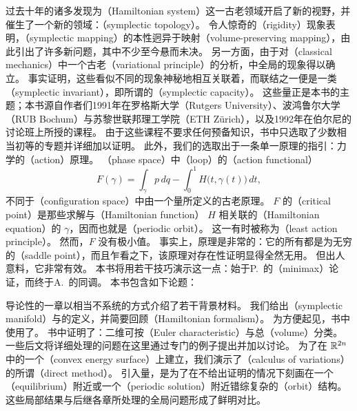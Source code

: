 
过去十年的诸多发现为\textbf{\trHamiltonianSystem}（Hamiltonian system）这一古老领域开启了新的视野，并催生了一个新的领域：\textbf{\trSymplecticTopology}（symplectic topology）。
令人惊奇的\textbf{\trRigidity}（rigidity）现象表明，\textbf{\trSymplectic\trMapping}（symplectic mapping）的本性迥异于\trVolumePreserving{}映射（volume-preserving mapping），由此引出了许多新问题，其中不少至今悬而未决。
另一方面，由于对\textbf{\trClassicalMechanics}（classical mechanics）中一个古老\textbf{\trVariationalPrinciple}（variational principle）的分析，\trHamiltonianSystem{}中全局的\trPeriodic{}现象得以确立。
事实证明，这些看似不同的现象神秘地相互关联着，而联结之一便是一类\textbf{\trSymplecticInvariant}（symplectic invariant），即所谓的\textbf{\trSymplecticCapacity}（symplectic capacity）。
这些\trInvariant{}量正是本书的主题；本书源自作者们1991年在罗格斯大学（Rutgers University）、波鸿鲁尔大学（RUB Bochum）与苏黎世联邦理工学院（ETH Z\"urich），以及1992年在伯尔尼的\trBorel{}讨论班上所授的课程。
由于这些课程不要求任何预备知识，书中只选取了少数相当初等的专题并详细加以证明。
此外，我们的选取出于一条单一原理的指引：力学的\textbf{\trAction}（action）原理。
\textbf{\trPhaseSpace}（phase space）中\textbf{\trLoop}（loop）的\textbf{\trActionFunctional}（action functional）
\begin{equation*}
F(\gamma)=\int_\gamma p\,dq-\int_0^1 H\bigl(t,\gamma(t)\bigr)\,dt,
\end{equation*}
不同于\textbf{\trConfigurationSpace}（configuration space）中由一个\trLagrange{}量所定义的古老\trHamiltonian{}原理。
$F$ 的\textbf{\trCriticalPoint}（critical point）是那些求解与\textbf{\trHamiltonianFunction}（Hamiltonian function） $H$ 相关联的\textbf{\trHamiltonianEquation}（Hamiltonian equation）的\trLoop{} $\gamma$，因而也就是\textbf{\trPeriodicOrbit}（periodic orbit）。
这一\trVariationalPrinciple{}有时被称为\textbf{\trLeastActionPrinciple}（least action principle）。
然而，$F$ 没有极小值。
事实上，\trAction{}原理是非常\trDegenerate{}的：它的所有\trCriticalPoint{}都是\trMorseIndex{}为无穷的\textbf{\trSaddlePoint}（saddle point），而且乍看之下，该原理对存在性证明显得全然无用。
但出人意料，它非常有效。
本书将用若干\trVariational{}技巧演示这一点：始于P.~\trRabinowitz{}的\textbf{\trMinimax}（minimax）论证，而终于A.~\trFloer{}的同调。
本书包含如下论题：

导论性的一章以相当不系统的方式介绍了若干背景材料。
我们给出\textbf{\trSymplecticManifold}（symplectic manifold）与\trSymplecticMapping{}的定义，并简要回顾\textbf{\trHamiltonianFormalism}（Hamiltonian formalism）。
为方便起见，书中使用了\trCartanCalculus。
书中证明了：二维\trSymplecticManifold{}可按\textbf{\trEulerCharacteristic}（Euler characteristic）与总\textbf{\trVolume}（volume）分类。
一些后文将详细处理的问题在这里通过专门的例子提出并加以讨论。
为了在 $\mathbb{R}^{2n}$ 中\trHamiltonianSystem{}的一个\textbf{\trConvex\trEnergySurface}（convex energy surface）上建立\trPeriodicOrbit，我们演示了\textbf{\trCalculusOfVariations}（calculus of variations）的所谓\textbf{\trDirectMethod}（direct method）。
引入\trBirkhoff\trInvariant{}量，是为了在不给出证明的情况下刻画\trHamiltonianSystem{}在一个\textbf{\trEquilibrium}（equilibrium）附近或一个\textbf{\trPeriodicSolution}（periodic solution）附近错综复杂的\textbf{\trOrbit}（orbit）结构。
这些局部结果与后继各章所处理的全局问题形成了鲜明对比。

